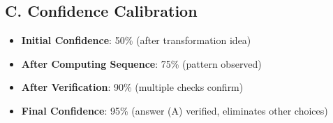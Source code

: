 \documentclass[11pt]{article}
\begin{document}
\begin{verificationbox}
\subsection*{C. Confidence Calibration}
\begin{itemize}[leftmargin=*]
    \item \textbf{Initial Confidence}: 50\% (after transformation idea)
    
    \item \textbf{After Computing Sequence}: 75\% (pattern observed)
    
    \item \textbf{After Verification}: 90\% (multiple checks confirm)
    
    \item \textbf{Final Confidence}: 95\% (answer (A) verified, eliminates other choices)
\end{itemize}
\end{verificationbox}
\end{document}
